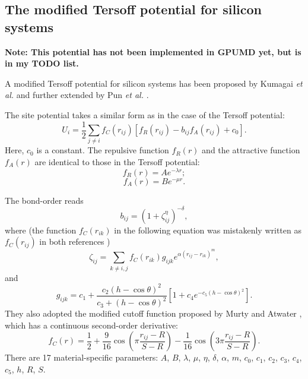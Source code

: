\documentclass[12pt,a4paper]{report}
\begin{document}
\subsection{The modified Tersoff potential for silicon systems}

\textbf{Note: This potential has not been implemented in GPUMD yet, but is in my TODO list.}

A modified Tersoff potential for silicon systems has been proposed by Kumagai \textit{et al.} \cite{kumagai2007cms} and further extended by Pun \textit{et al.} \cite{pun2017prb}.

The site potential takes a similar form as in the case of the Tersoff potential:
\begin{equation}
U_i =  \frac{1}{2} \sum_{j \neq i} f_C(r_{ij}) \left[ f_R(r_{ij}) - b_{ij} f_A(r_{ij}) + c_0\right].
\end{equation}
Here, $c_0$ is a constant. The repulsive function $f_{R}(r)$ and the attractive function $f_{A}(r)$ are identical to those in the Tersoff potential:
\begin{equation}
f_{R}(r) = A e^{-\lambda r};
\end{equation}
\begin{equation}
f_{A}(r) = B e^{-\mu r}.
\end{equation}

The bond-order reads
\begin{equation}
b_{ij} = \left(1 + \zeta_{ij}^{\eta}\right)^{-\delta},
\end{equation}
where (the function $f_C(r_{ik})$ in the following equation was mistakenly written as $f_C(r_{ij})$ in both references \cite{kumagai2007cms,pun2017prb})
\begin{equation}
\zeta_{ij} = \sum_{k\neq i, j}f_C(r_{ik}) g_{ijk} e^{\alpha (r_{ij} - r_{ik})^m},
\end{equation}
and
\begin{equation}
g_{ijk} = c_1 + \frac{c_2(h-\cos\theta)^2}{c_3+(h-\cos\theta)^2}
                \left[1+c_4e^{-c_5(h-\cos\theta)^2}\right].
\end{equation}
They also adopted the modified cutoff function proposed by
Murty and Atwater \cite{murty1995prb}, which has a continuous second-order derivative:
\begin{equation}
f_{C}(r) = \frac{1}{2} +
\frac{9}{16} \cos \left( \pi \frac{r_{ij} - R}{S - R} \right) -
\frac{1}{16} \cos \left( 3\pi \frac{r_{ij} - R}{S - R} \right).
\end{equation}
There are 17 material-specific parameters: $A$, $B$, $\lambda$, $\mu$, $\eta$, $\delta$, $\alpha$, $m$, $c_0$, $c_1$, $c_2$, $c_3$, $c_4$, $c_5$, $h$, $R$, $S$.
\end{document}
